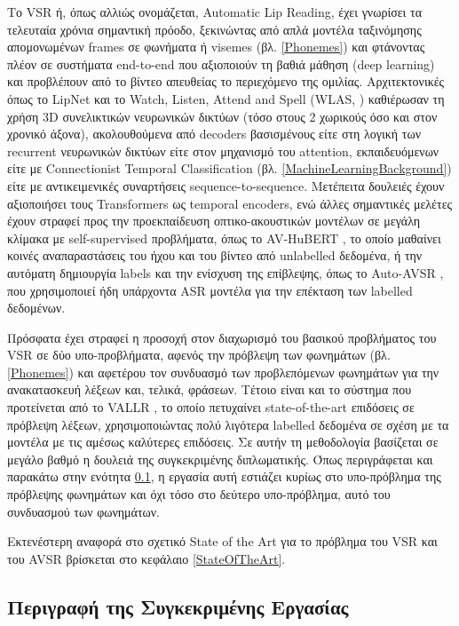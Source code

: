 Το VSR ή, όπως αλλιώς ονομάζεται, Automatic Lip Reading, έχει γνωρίσει τα τελευταία χρόνια σημαντική πρόοδο, ξεκινώντας από απλά μοντέλα ταξινόμησης απομονωμένων frames σε φωνήματα ή visemes (βλ. \ref{Phonemes}) και φτάνοντας πλέον σε συστήματα end-to-end που αξιοποιούν τη βαθιά μάθηση (deep learning) και προβλέπουν από το βίντεο απευθείας το περιεχόμενο της ομιλίας. Αρχιτεκτονικές όπως το LipNet \cite{assael2016lipnetendtoendsentencelevellipreading} και το Watch, Listen, Attend and Spell (WLAS, \cite{Chung17}) καθιέρωσαν τη χρήση 3D συνελικτικών νευρωνικών δικτύων (τόσο στους 2 χωρικούς όσο και στον χρονικό άξονα), ακολουθούμενα από decoders βασισμένους είτε στη λογική των recurrent νευρωνικών δικτύων είτε στον μηχανισμό του attention, εκπαιδευόμενων είτε με Connectionist Temporal Classification (βλ. \ref{MachineLearningBackground}) είτε με αντικειμενικές συναρτήσεις sequence-to-sequence. Μετέπειτα δουλειές έχουν αξιοποιήσει τους Transformers ως temporal encoders, ενώ άλλες σημαντικές μελέτες έχουν στραφεί προς την προεκπαίδευση οπτικο-ακουστικών μοντέλων σε μεγάλη κλίμακα με self-supervised προβλήματα, όπως το AV-HuBERT \cite{shi2022learningaudiovisualspeechrepresentation}, το οποίο μαθαίνει κοινές αναπαραστάσεις του ήχου και του βίντεο από unlabelled δεδομένα, ή την αυτόματη δημιουργία labels και την ενίσχυση της επίβλεψης, όπως το Auto-AVSR \cite{Ma_2023}, που χρησιμοποιεί ήδη υπάρχοντα ASR μοντέλα για την επέκταση των labelled δεδομένων.

Πρόσφατα έχει στραφεί η προσοχή στον διαχωρισμό του βασικού προβλήματος του VSR σε δύο υπο-προβλήματα, αφενός την πρόβλεψη των φωνημάτων (βλ. \ref{Phonemes}) και αφετέρου τον συνδυασμό των προβλεπόμενων φωνημάτων για την ανακατασκευή λέξεων και, τελικά, φράσεων. Τέτοιο είναι και το σύστημα που προτείνεται από το VALLR \cite{thomas2026vallrvisualasrlanguage}, το οποίο πετυχαίνει state-of-the-art επιδόσεις σε πρόβλεψη λέξεων, χρησιμοποιώντας πολύ λιγότερα labelled δεδομένα σε σχέση με τα μοντέλα με τις αμέσως καλύτερες επιδόσεις. Σε αυτήν τη μεθοδολογία βασίζεται σε μεγάλο βαθμό η δουλειά της συγκεκριμένης διπλωματικής. Όπως περιγράφεται και παρακάτω στην ενότητα \ref{ThisWork}, η εργασία αυτή εστιάζει κυρίως στο υπο-πρόβλημα της πρόβλεψης φωνημάτων και όχι τόσο στο δεύτερο υπο-πρόβλημα, αυτό του συνδυασμού των φωνημάτων. 

Εκτενέστερη αναφορά στο σχετικό State of the Art για το πρόβλημα του VSR και του AVSR βρίσκεται στο κεφάλαιο \ref{StateOfTheArt}.

\subsection{Περιγραφή της Συγκεκριμένης Εργασίας}
\label{ThisWork}

